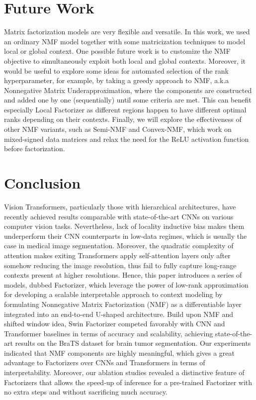 \documentclass[a4,12pt]{article}
\begin{document}
	
	\section{Future Work} \label{sec: future work}
	
	Matrix factorization models are very flexible and versatile. In this work, we used an ordinary NMF model together with some matricization techniques to model local or global context. One possible future work is to customize the NMF objective to simultaneously exploit both local and global contexts. Moreover, it would be useful to explore some ideas for automated selection of the rank hyperparameter, for example, by taking a greedy approach to NMF, a.k.a Nonnegative Matrix Underapproximation, where the components are constructed and added one by one (sequentially) until some criteria are met. This can benefit especially Local Factorizer as different regions happen to have different optimal ranks depending on their contexts. Finally, we will explore the effectiveness of other NMF variants, such as Semi-NMF and Convex-NMF, which work on mixed-signed data matrices and relax the need for the ReLU activation function before factorization.  
	
	
	\section{Conclusion} \label{sec: conclusion}
	
	Vision Transformers, particularly those with hierarchical architectures, have recently achieved results comparable with state-of-the-art CNNs on various computer vision tasks. Nevertheless, lack of locality inductive bias makes them underperform their CNN counterparts in low-data regimes, which is usually the case in medical image segmentation. Moreover, the quadratic complexity of attention makes exiting Transformers apply self-attention layers only after somehow reducing the image resolution, thus fail to fully capture long-range contexts present at higher resolutions. Hence, this paper introduces a series of models, dubbed Factorizer, which leverage the power of low-rank approximation for developing a scalable interpretable approach to context modeling by formulating Nonnegative Matrix Factorization (NMF) as a differentiable layer integrated into an end-to-end U-shaped architecture. Build upon NMF and shifted window idea, Swin Factorizer competed favorably with CNN and Transformer baselines in terms of accuracy and scalability, achieving state-of-the-art results on the BraTS dataset for brain tumor segmentation. Our experiments indicated that NMF components are highly meaningful, which gives a great advantage to Factorizers over CNNs and Transformers in terms of interpretability. Moreover, our ablation studies revealed a distinctive feature of Factorizers that allows the speed-up of inference for a pre-trained Factorizer with no extra steps and without sacrificing much accuracy.
	
\end{document}
